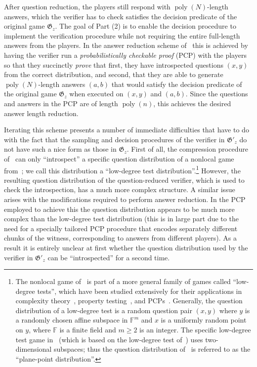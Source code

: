\documentclass[11pt]{article}
\theoremstyle{definition}
\newcommand{\F}{\ensuremath{\mathbb{F}}}
\DeclareMathOperator{\poly}{poly}
\newcommand{\game}{\mathfrak{G}}
\begin{document}
	After question reduction, the players still respond with $\poly(N)$-length answers, which the verifier has to check satisfies the decision predicate of the original game $\game_z$. The goal of Part (2) is to enable the decision procedure to implement the verification procedure while not requiring the entire full-length answers from the players. In the answer reduction scheme of~\cite{NW19} this is achieved by having the verifier run a \emph{probabilistically checkable proof} (PCP) with the players so that they succinctly \emph{prove} that first, they have introspected questions $(x,y)$ from the correct distribution, and second, that they are able to generate $\poly(N)$-length answers $(a,b)$ that would satisfy the decision predicate of the original game $\game_z$ when executed on $(x,y)$ and $(a,b)$. Since the questions and answers in the PCP are of length $\poly(n)$, this achieves the desired answer length reduction.
	
	Iterating this scheme presents a number of immediate difficulties that have to do with the fact that the sampling and decision procedures of the verifier in $\game'_z$ do not have such a nice form as those in $\game_z$. First of all, the compression procedure of~\cite{NW19} can only ``introspect'' a specific question distribution of a nonlocal game from~\cite{natarajan2018two}; we call this distribution a ``low-degree test distribution''.\footnote{The nonlocal game of~\cite{natarajan2018two} is part of a more general family of games called ``low-degree tests'', which have been studied extensively for their applications in complexity theory~\cite{babai1991non}, property testing~\cite{rubinfeld1996robust}, and PCPs~\cite{arora1998probabilistic}. Generally, the question distribution of a low-degree test is a random question pair $(x,y)$ where $y$ is a randomly chosen affine subspace in $\F^m$ and $x$ is a uniformly random point on $y$, where $\F$ is a finite field and $m \geq 2$ is an integer. The specific low-degree test game in~\cite{natarajan2018two} (which is based on the low-degree test of~\cite{raz1997sub}) uses two-dimensional subspaces; thus the question distribution of~\cite{raz1997sub,natarajan2018two} is referred to as the ``plane-point distribution''.} However, the resulting question distribution of the question-reduced verifier, which is used to check the introspection, has a much more complex structure. A similar issue arises with the modifications required to perform answer reduction. In the PCP employed to achieve this the question distribution appears to be much more complex than the low-degree test distribution (this is in large part due to the need for a specially tailored PCP procedure that encodes separately different chunks of the witness, corresponding to answers from different players). As a result it is entirely unclear at first whether the question distribution used by the verifier in $\game'_z$ can be ``introspected'' for a second time. 
	
\end{document}
